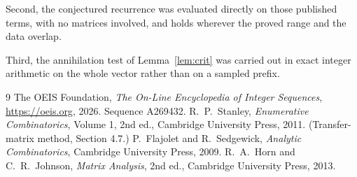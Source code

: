 \documentclass[11pt,a4paper]{article}
\theoremstyle{plain}
\theoremstyle{definition}
\begin{document}
Second, the conjectured recurrence was evaluated directly on those published terms, with no
matrices involved, and holds wherever the proved range and the data overlap.

Third, the annihilation test of Lemma~\ref{lem:crit} was carried out in exact integer
arithmetic on the whole vector rather than on a sampled prefix.

\begin{thebibliography}{9}
 The OEIS Foundation, \emph{The On-Line Encyclopedia of Integer
Sequences}, \url{https://oeis.org}, 2026. Sequence A269432.
 R.~P.~Stanley, \emph{Enumerative Combinatorics}, Volume 1, 2nd ed.,
Cambridge University Press, 2011. (Transfer-matrix method, Section 4.7.)
 P.~Flajolet and R.~Sedgewick, \emph{Analytic Combinatorics}, Cambridge
University Press, 2009.
 R.~A.~Horn and C.~R.~Johnson, \emph{Matrix Analysis}, 2nd ed., Cambridge
University Press, 2013.
\end{thebibliography}
\end{document}
